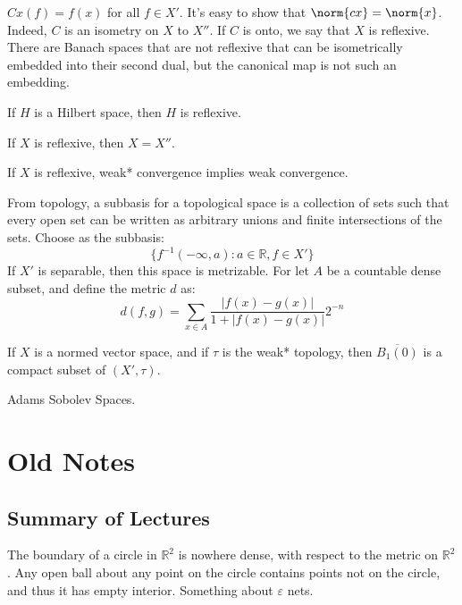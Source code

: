         $Cx(f)=f(x)$ for all $f\in{X'}$. It's easy to
        show that $\norm{cx}=\norm{x}$. Indeed,
        $C$ is an isometry on $X$ to $X''$. If $C$ is
        onto, we say that $X$ is reflexive. There are
        Banach spaces that are not reflexive that can
        be isometrically embedded into their second dual,
        but the canonical map is not such an embedding.
        \begin{theorem}
            If $H$ is a Hilbert space, then $H$ is reflexive.
        \end{theorem}
        \begin{theorem}
            If $X$ is reflexive, then
            $X=X''$.
        \end{theorem}
        \begin{theorem}
            If $X$ is reflexive, weak* convergence
            implies weak convergence.
        \end{theorem}
        From topology, a subbasis for a topological space
        is a collection of sets such that every open set can
        be written as arbitrary unions and finite intersections
        of the sets. Choose as the subbasis:
        \begin{equation}
            \{f^{-1}(-\infty,a):a\in\mathbb{R},f\in{X'}\}
        \end{equation}
        If $X'$ is separable, then this space is metrizable.
        For let $A$ be a countable dense subset, and define
        the metric $d$ as:
        \begin{equation}
            d(f,g)=\sum_{x\in{A}}
            \frac{|f(x)-g(x)|}{1+|f(x)-g(x)|}2^{-n}
        \end{equation}
        \begin{theorem}
            If $X$ is a normed vector space, and if
            $\tau$ is the weak* topology, then
            $\overline{B_{1}(0)}$ is a compact subset of
            $(X',\tau)$.
        \end{theorem}
        Adams Sobolev Spaces.
\chapter{Old Notes}
    \section{Summary of Lectures}
        The boundary of a circle
        in $\mathbb{R}^{2}$ is nowhere dense,
        with respect to the metric on $\mathbb{R}^{2}$.
        Any open ball about any point on the circle contains
        points not on the circle, and thus it has empty
        interior. Something about $\varepsilon$ nets.
